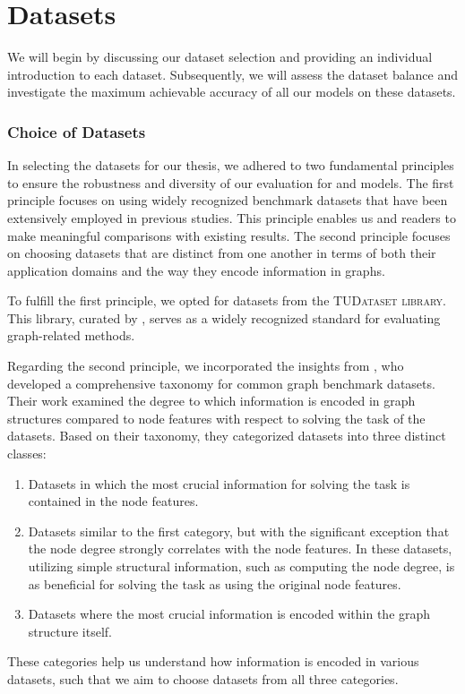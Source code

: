 \section{Datasets}\label{sec:datasets}
We will begin by discussing our dataset selection and providing an individual introduction to each dataset. Subsequently, we will assess the dataset balance and investigate the maximum achievable accuracy of all our models on these datasets.

\subsubsection{Choice of Datasets}
In selecting the datasets for our thesis, we adhered to two fundamental principles to ensure the robustness and diversity of our evaluation for \gnn and \wlnn models. The first principle focuses on using widely recognized benchmark datasets that have been extensively employed in previous studies. This principle enables us and readers to make meaningful comparisons with existing results. The second principle focuses on choosing datasets that are distinct from one another in terms of both their application domains and the way they encode information in graphs.

To fulfill the first principle, we opted for datasets from the \textsc{TUDataset library}. This library, curated by \cite{Mor+2020}, serves as a widely recognized standard for evaluating graph-related methods.

Regarding the second principle, we incorporated the insights from \cite{Liu2022}, who developed a comprehensive taxonomy for common graph benchmark datasets. Their work examined the degree to which information is encoded in graph structures compared to node features with respect to solving the task of the datasets. Based on their taxonomy, they categorized datasets into three distinct classes:
\begin{enumerate}[label={Category \arabic*:},leftmargin=*]
	\item Datasets in which the most crucial information for solving the task is contained in the node features.
	\item Datasets similar to the first category, but with the significant exception that the node degree strongly correlates with the node features. In these datasets, utilizing simple structural information, such as computing the node degree, is as beneficial for solving the task as using the original node features.
	\item Datasets where the most crucial information is encoded within the graph structure itself.
\end{enumerate}
These categories help us understand how information is encoded in various datasets, such that we aim to choose datasets from all three categories.

